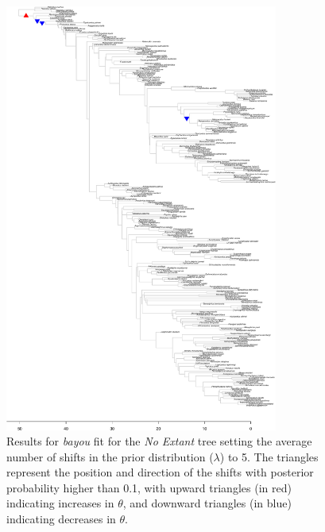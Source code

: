 \begin{figure}[H]
\includegraphics[width=0.8\textwidth]{img/plots-noextant-wZBL-k5-1.pdf}
\caption{Results for \textit{bayou} fit for the \textit{No Extant} tree setting the average number of shifts in the prior distribution ($\lambda$) to 5. The triangles represent the position and direction of the shifts with posterior probability higher than 0.1, with upward triangles (in red) indicating increases in $\theta$, and downward triangles (in blue) indicating decreases in $\theta$.}
\label{fig:noextant-k5}
\end{figure}

\newpage

